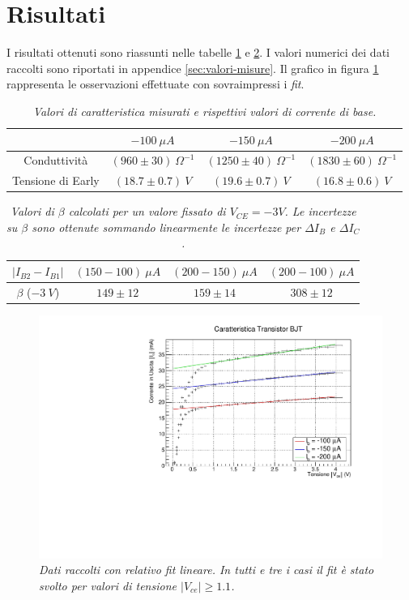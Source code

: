 \section{Risultati}\label{sec:risultati}
  I risultati ottenuti sono riassunti nelle tabelle \ref{tab : risultati} e \ref{tab : risultati-beta}. I valori numerici dei dati raccolti sono riportati in appendice \ref{sec:valori-misure}. Il grafico in figura \ref{fig : dati raccolti} rappresenta le osservazioni effettuate con sovraimpressi i \emph{fit}.
  \begin{table}[H]
    \centering
    \begin{tabular}[t]{c | c  c  c }
      \hline
      & $-100 \: \mu A$ & $-150 \: \mu A$ & $-200\: \mu A$ \\
      \hline
      Conduttività & $(960 \pm 30) \: \Omega^{-1}$ & $(1250 \pm 40) \: \Omega^{-1}$ & $(1830 \pm 60) \: \Omega^{-1}$ \\
      Tensione di Early & $(18.7 \pm 0.7) \: V$ & $(19.6 \pm 0.7) \: V$ & $(16.8 \pm 0.6) \: V$ \\
      \hline
    \end{tabular}
    \caption{\emph{Valori di caratteristica misurati e rispettivi valori di corrente di base.}}
    \label{tab : risultati}
  \end{table}
  \begin{table}[H]
    \centering
    \begin{tabular}[t]{c | c  c  c }
      \hline
      $\left|I_{B2} - I_{B1}\right|$ & $(150 - 100) \: \mu A$ & $(200 - 150) \: \mu A$ & $(200 - 100)\: \mu A$ \\
      \hline
      $\beta$ ($-3 \: V$) & $149 \pm 12$ & $159 \pm 14$ & $308 \pm 12$ \\
      \hline
    \end{tabular}
    \caption{\emph{Valori di $\beta$ calcolati per un valore fissato di $V_{CE} = -3V$. Le incertezze su $\beta$ sono ottenute sommando
    linearmente le incertezze per $\Delta I_B$ e $\Delta I_C$.}}
    \label{tab : risultati-beta}
  \end{table}

  \begin{figure}[h]
    \includegraphics[width=\textwidth]{../assets/GraficoTot.pdf}
    \caption{\emph{Dati raccolti con relativo fit lineare. In tutti e tre i casi il fit è stato svolto per valori di tensione $\left|V_{ce}\right| \geq 1.1$.}}
    \label{fig : dati raccolti}
  \end{figure}
